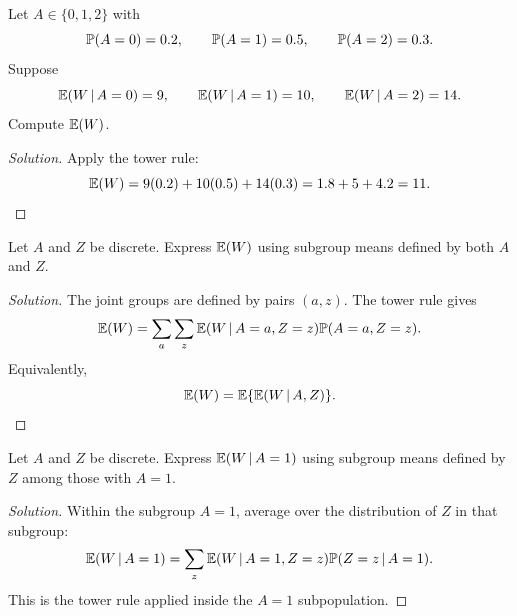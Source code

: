 \begin{exercise}
Let $A\in\{0,1,2\}$ with
\[
\mathbb{P}(A=0)=0.2,\qquad
\mathbb{P}(A=1)=0.5,\qquad
\mathbb{P}(A=2)=0.3.
\]
Suppose
\[
\mathbb{E}(W\,\vert\, A=0)=9,\qquad
\mathbb{E}(W\,\vert\, A=1)=10,\qquad
\mathbb{E}(W\,\vert\, A=2)=14.
\]
Compute $\mathbb{E}(W)$.
\end{exercise}

\begin{proof}[Solution]
Apply the tower rule:
\[
\mathbb{E}(W)
=9(0.2)+10(0.5)+14(0.3)
=1.8+5+4.2
=11.
\]
\end{proof}

\begin{exercise}
Let $A$ and $Z$ be discrete. Express $\mathbb{E}(W)$ using subgroup means defined by both $A$ and $Z$.
\end{exercise}

\begin{proof}[Solution]
The joint groups are defined by pairs $(a,z)$. The tower rule gives
\[
\mathbb{E}(W)
=
\sum_a\sum_z \mathbb{E}(W\,\vert\, A=a,Z=z)\mathbb{P}(A=a,Z=z).
\]
Equivalently,
\[
\mathbb{E}(W)=\mathbb{E}\{\mathbb{E}(W\,\vert\, A,Z)\}.
\]
\end{proof}

\begin{exercise}
Let $A$ and $Z$ be discrete. Express $\mathbb{E}(W\,\vert\, A=1)$ using subgroup means defined by $Z$ among those with $A=1$.
\end{exercise}

\begin{proof}[Solution]
Within the subgroup $A=1$, average over the distribution of $Z$ in that subgroup:
\[
\mathbb{E}(W\,\vert\, A=1)
=
\sum_z \mathbb{E}(W\,\vert\, A=1,Z=z)\mathbb{P}(Z=z\,\vert\, A=1).
\]
This is the tower rule applied inside the $A=1$ subpopulation.
\end{proof}
